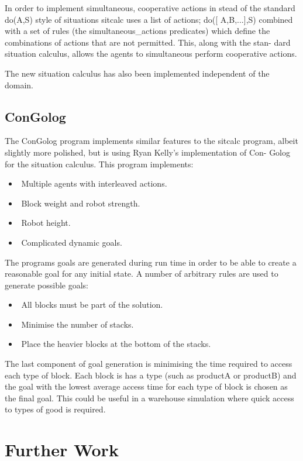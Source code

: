 \documentclass{article}
\begin{document}
In order to implement simultaneous, cooperative actions in stead of the
standard do(A,S) style of situations sitcalc uses a list of actions; do([ A,B,...],S)
combined with a set of rules (the simultaneous\_actions predicates) which define
the combinations of actions that are not permitted. This, along with the stan-
dard situation calculus, allows the agents to simultaneous perform cooperative
actions.

The new situation calculus has also been implemented independent of the
domain.

\subsection{ConGolog}
The ConGolog program implements similar features to the sitcalc program,
albeit slightly more polished, but is using Ryan Kelly's implementation of Con-
Golog for the situation calculus.
This program implements:
\begin{itemize}
	\item Multiple agents with interleaved actions.
	\item Block weight and robot strength.
	\item Robot height.
	\item Complicated dynamic goals.
\end{itemize}

The programs goals are generated during run time in order to be able to
create a reasonable goal for any initial state. A number of arbitrary rules are
used to generate possible goals:
\begin{itemize}
	\item All blocks must be part of the solution.
	\item Minimise the number of stacks.
	\item Place the heavier blocks at the bottom of the stacks.
\end{itemize}

The last component of goal generation is minimising the time required to
access each type of block. Each block is has a type (such as productA or
productB) and the goal with the lowest average access time for each type of
block is chosen as the final goal. This could be useful in a warehouse simulation
where quick access to types of good is required.


\section{Further Work}
\end{document}
